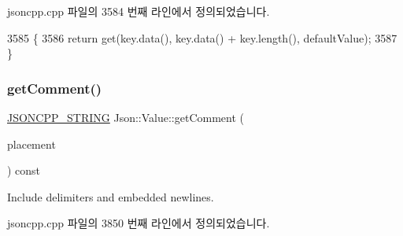 jsoncpp.\+cpp 파일의 3584 번째 라인에서 정의되었습니다.


\begin{DoxyCode}
3585 \{
3586   \textcolor{keywordflow}{return} \textcolor{keyword}{get}(key.data(), key.data() + key.length(), defaultValue);
3587 \}
\end{DoxyCode}
\mbox{\label{class_json_1_1_value_a82817229a986f0b254e31d5c83066ffe}} 
\subsubsection{\texorpdfstring{get\+Comment()}{getComment()}}
{\footnotesize\ttfamily \hyperlink{json_8h_a1e723f95759de062585bc4a8fd3fa4be}{J\+S\+O\+N\+C\+P\+P\+\_\+\+S\+T\+R\+I\+NG} Json\+::\+Value\+::get\+Comment (\begin{DoxyParamCaption}\item[{\hyperlink{namespace_json_a4fc417c23905b2ae9e2c47d197a45351}{Comment\+Placement}}]{placement }\end{DoxyParamCaption}) const}



Include delimiters and embedded newlines. 



jsoncpp.\+cpp 파일의 3850 번째 라인에서 정의되었습니다.


